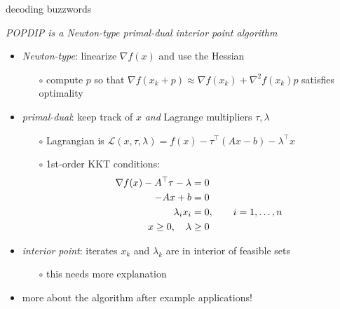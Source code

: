 \documentclass[10pt,hyperref,dvipsnames]{beamer}
\newcommand{\grad}{\nabla}
\newcommand{\ds}{\displaystyle}
\begin{document}
\begin{frame}{decoding buzzwords}

\begin{center}
\emph{POPDIP is a {\color{BrickRed} Newton-type} {\color{OliveGreen} primal-dual} {\color{blue} interior point} algorithm}
\end{center}

\begin{itemize}
\item \emph{{\color{BrickRed} Newton-type}}: linearize $\grad f(x)$ and use the Hessian
    \begin{itemize}
    \item[$\circ$] compute $p$ so that $\grad f(x_k + p) \approx \grad f(x_k) + \grad^2 f(x_k) p$ satisfies optimality
    \end{itemize}
\item \emph{{\color{OliveGreen} primal-dual}}: keep track of $x$ \emph{and} Lagrange multipliers $\tau,\lambda$
    \begin{itemize}
    \item[$\circ$] Lagrangian is \qquad $\ds \mathcal{L}(x,\tau,\lambda) = f(x) - \tau^\top (Ax - b) - \lambda^\top x$
    \item[$\circ$] 1st-order KKT conditions:
\begin{align*}
\grad f(x) - A^\top \tau - \lambda &= 0 \\
-A x + b &= 0 \notag \\
\lambda_i x_i &=0, \qquad i=1,\dots,n \notag \\
x \ge 0, \quad \lambda &\ge 0 \notag
\end{align*}
    \end{itemize}
\item \emph{{\color{blue} interior point}}: iterates $x_k$ and $\lambda_k$ are in interior of feasible sets
    \begin{itemize}
    \item[$\circ$] this needs more explanation
    \end{itemize}

\medskip
\item more about the algorithm after example applications!
\end{itemize}
\end{frame}
\end{document}
